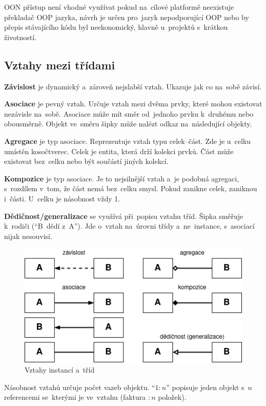 OON přístup není vhodné využívat pokud na~cílové platformě neexistuje překladač OOP jazyka, návrh je určen pro~jazyk nepodporující OOP nebo by přepis stávajícího kódu byl neekonomický, hlavně u~projektů s~krátkou životností.

\subsection{Vztahy mezi třídami}

\textbf{Závislost} je dynamický a~zároveň nejslabší vztah. Ukazuje jak co na~sobě závisí.

\textbf{Asociace} je pevný vztah. Určuje vztah mezi dvěma prvky, které mohou existovat nezávisle na~sobě. Asociace může mít směr od~jednoho prvku k~druhému nebo obousměrně. Objekt ve~směru šipky může nalézt odkaz na~následující objekty.

\textbf{Agregace} je typ asociace. Reprezentuje vztah typu celek--část. Zde je u~celku umístěn kosočtverec. Celek je entita, která drží kolekci prvků. Část může existovat bez~celku nebo být součástí jiných kolekcí.

\textbf{Kompozice} je typ asociace. Je to nejsilnější vztah a~je podobná agregaci, s~rozdílem v~tom, že část nemá bez~celku smysl. Pokud zanikne celek, zaniknou i~části. U~celku je násobnost vždy 1.

\textbf{Dědičnost/generalizace} se využívá při~popisu vztahu tříd. Šipka směřuje k~rodiči (\enquote{B~dědí z~A}). Jde o~vztah na~úrovni třídy a~ne~instance, s~asociací nijak nesouvisí.

\begin{figure}[ht]
	\centering
	\includegraphics[scale=0.8]{images/vztahy-trid}
	\caption{Vztahy instancí a~tříd}
\end{figure}

Násobnost vztahů určuje počet vazeb objektu. \enquote{\( 1:n \)} popisuje jeden objekt s~\( n \) referencemi se~kterými je ve~vztahu (faktura \( :n \) položek).

